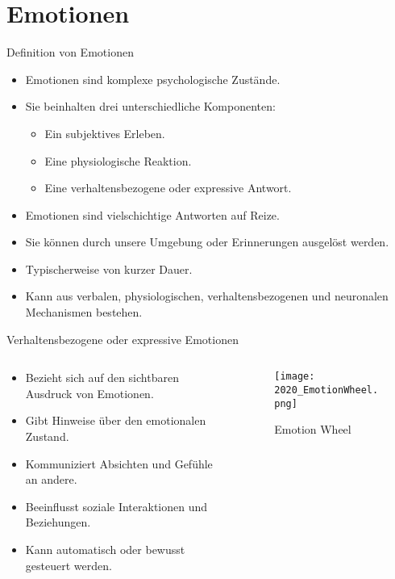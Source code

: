 \documentclass[aspectratio=169]{beamer}
\begin{document}
\section{Emotionen}
\begin{frame}{Definition von Emotionen}
  \begin{itemize}
    \item Emotionen sind komplexe psychologische Zustände.
    \item Sie beinhalten drei unterschiedliche Komponenten:
          \begin{itemize}
            \item Ein subjektives Erleben.
            \item Eine physiologische Reaktion.
            \item Eine verhaltensbezogene oder expressive Antwort.
          \end{itemize}
    \item Emotionen sind vielschichtige Antworten auf Reize.
    \item Sie können durch unsere Umgebung oder Erinnerungen ausgelöst werden.
    \item Typischerweise von kurzer Dauer.
    \item Kann aus verbalen, physiologischen, verhaltensbezogenen und neuronalen Mechanismen bestehen.
  \end{itemize}
\end{frame}

\begin{frame}{Verhaltensbezogene oder expressive Emotionen}
  \begin{columns}
    \begin{column}{0.7\textwidth}
      \begin{itemize}
        \item Bezieht sich auf den sichtbaren Ausdruck von Emotionen.
        \item Gibt Hinweise über den emotionalen Zustand.
        \item Kommuniziert Absichten und Gefühle an andere.
        \item Beeinflusst soziale Interaktionen und Beziehungen.
        \item Kann automatisch oder bewusst gesteuert werden.
      \end{itemize}
    \end{column}
    \begin{column}{0.3\textwidth}
      \begin{figure}[h]
        \centering
        \texttt{[image: 2020\_EmotionWheel.png]}
        \caption{Emotion Wheel}
      \end{figure}
    \end{column}
  \end{columns}
\end{frame}
\end{document}
